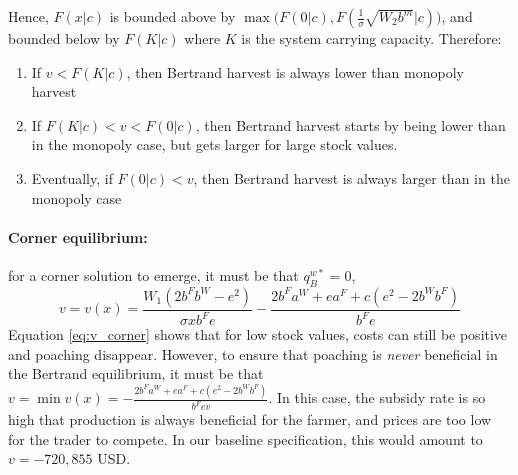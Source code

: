 Hence, $F(x|c)$ is bounded above by $\max \big(F(0|c),F(\frac{1}{\sigma}\sqrt{W_2 b^m}|c)\big)$, and bounded below by $F(K|c)$ where $K$ is the system carrying capacity. Therefore:
\begin{enumerate}
    \item If $v<F(K|c)$, then Bertrand harvest is always lower than monopoly harvest
    \item If $F(K|c)<v<F(0|c)$, then Bertrand harvest starts by being lower than in the monopoly case, but gets larger for large stock values. 
    \item Eventually, if $F(0|c)<v$, then Bertrand harvest is always larger than in the monopoly case
\end{enumerate}


\paragraph{Corner equilibrium:}
for a corner solution to emerge, it must be that $q_B^{w*}=0$,
\begin{equation}
    v = v(x) = \frac{W_1(2b^F b^W - e^2)}{\sigma x b^F e} - \frac{2b^F a^W + ea^F + c(e^2 - 2b^W b^F)}{b^F e }
    \label{eq:v_corner}
\end{equation}
Equation \ref{eq:v_corner} shows that for low stock values, costs can still be positive and poaching disappear. However, to ensure that poaching is \textit{never} beneficial in the Bertrand equilibrium, it must be that $v = \min v(x) = - \frac{2b^F a^W + ea^F + c(e^2 - 2b^W b^F)}{b^F e v}$. In this case, the subsidy rate is so high that production is always beneficial for the farmer, and prices are too low for the trader to compete. In our baseline specification, this would amount to $v = - 720,855$ USD.  

